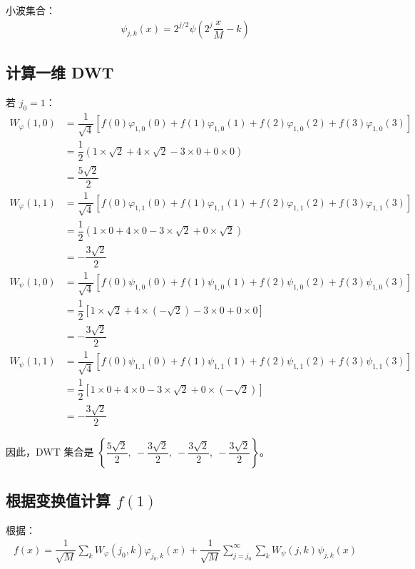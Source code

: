 \documentclass{article}
\begin{document}
小波集合：
\begin{align*}
    \psi_{j,k}(x)=2^{j/2}\psi\left(2^j\dfrac{x}{M}-k\right)
\end{align*}


\subsection{计算一维 DWT}
若 $j_0=1$：
\begin{align*}
    W_{\varphi}(1,0)&=\dfrac{1}{\displaystyle\sqrt{4}}\left[f(0)\varphi_{1,0}(0)+f(1)\varphi_{1,0}(1)+f(2)\varphi_{1,0}(2)+f(3)\varphi_{1,0}(3)\right]
    \\
    &=\dfrac{1}{2}\left(1\times\sqrt{2}+4\times\sqrt{2}-3\times0+0\times0\right)
    \\
    &=\dfrac{5\sqrt{2}}{2}
\end{align*}
\begin{align*}
    W_{\varphi}(1,1)&=\dfrac{1}{\displaystyle\sqrt{4}}\left[f(0)\varphi_{1,1}(0)+f(1)\varphi_{1,1}(1)+f(2)\varphi_{1,1}(2)+f(3)\varphi_{1,1}(3)\right]
    \\
    &=\dfrac{1}{2}\left(1\times0+4\times0-3\times\sqrt{2}+0\times\sqrt{2}\right)
    \\
    &=-\dfrac{3\sqrt{2}}{2}
\end{align*}
\begin{align*}
    W_{\psi}(1,0)&=\dfrac{1}{\displaystyle\sqrt{4}}\left[f(0)\psi_{1,0}(0)+f(1)\psi_{1,0}(1)+f(2)\psi_{1,0}(2)+f(3)\psi_{1,0}(3)\right]
    \\
    &=\dfrac{1}{2}\left[1\times\sqrt{2}+4\times\left(-\sqrt{2}\right)-3\times0+0\times0\right]
    \\
    &=-\dfrac{3\sqrt{2}}{2}
\end{align*}
\begin{align*}
    W_{\psi}(1,1)&=\dfrac{1}{\displaystyle\sqrt{4}}\left[f(0)\psi_{1,1}(0)+f(1)\psi_{1,1}(1)+f(2)\psi_{1,1}(2)+f(3)\psi_{1,1}(3)\right]
    \\
    &=\dfrac{1}{2}\left[1\times0+4\times0-3\times\sqrt{2}+0\times\left(-\sqrt{2}\right)\right]
    \\
    &=-\dfrac{3\sqrt{2}}{2}
\end{align*}

因此，DWT 集合是 $\left\{\dfrac{5\sqrt{2}}{2},\ -\dfrac{3\sqrt{2}}{2},\ -\dfrac{3\sqrt{2}}{2},\ -\dfrac{3\sqrt{2}}{2}\right\}$。



\subsection{根据变换值计算 $f(1)$}
根据：
\begin{align*}
    f(x)=\dfrac{1}{\displaystyle\sqrt{M}}\sum_{k}W_{\varphi}(j_0,k)\varphi_{j_0,k}(x)+\dfrac{1}{\displaystyle\sqrt{M}}\sum_{j=j_0}^{\infty}\sum_{k}W_{\psi}(j,k)\psi_{j,k}(x)
\end{align*}
\end{document}
